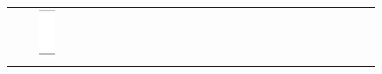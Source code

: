 \documentclass[10pt]{article}
\begin{document}
\begin{center}
\begin{tabular}{|c|c|c|c|c|c|c|c|c|c|c|c|c|c|c|c|c|c|c|c|c|c|c|c|c|c|c|c|}
 &  & \includegraphics[max width=\textwidth]{2024_11_21_b36d8cbb94edb763da2cg-15}

\end{tabular}
\end{center}
\end{document}
